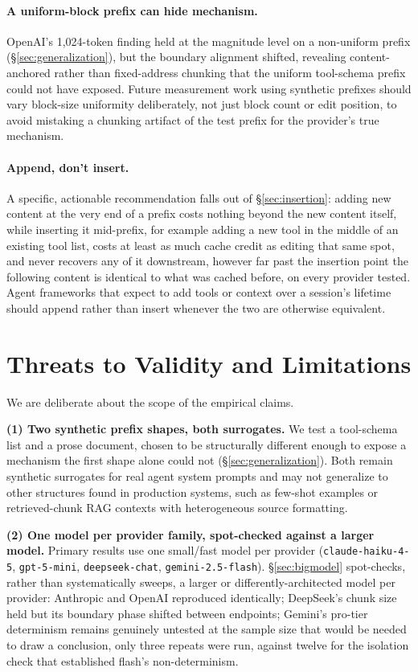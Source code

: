 \documentclass[11pt]{article}
\newcommand{\code}[1]{\texttt{#1}}
\begin{document}
\paragraph{A uniform-block prefix can hide mechanism.} OpenAI's 1{,}024-token
finding held at the magnitude level on a non-uniform prefix
(\S\ref{sec:generalization}), but the boundary alignment shifted, revealing
content-anchored rather than fixed-address chunking that the uniform
tool-schema prefix could not have exposed. Future measurement work using
synthetic prefixes should vary block-size uniformity deliberately, not
just block count or edit position, to avoid mistaking a chunking artifact
of the test prefix for the provider's true mechanism.

\paragraph{Append, don't insert.} A specific, actionable recommendation
falls out of \S\ref{sec:insertion}: adding new content at the very end of
a prefix costs nothing beyond the new content itself, while inserting it
mid-prefix, for example adding a new tool in the middle of an existing
tool list, costs at least as much cache credit as editing that same spot,
and never recovers any of it downstream, however far past the insertion
point the following content is identical to what was cached before, on
every provider tested. Agent frameworks that expect to add tools or
context over a session's lifetime should append rather than insert
whenever the two are otherwise equivalent.

\section{Threats to Validity and Limitations}
\label{sec:limitations}

We are deliberate about the scope of the empirical claims.

\textbf{(1) Two synthetic prefix shapes, both surrogates.} We test a
tool-schema list and a prose document, chosen to be structurally different
enough to expose a mechanism the first shape alone could not
(\S\ref{sec:generalization}). Both remain synthetic surrogates for real
agent system prompts and may not generalize to other structures found in
production systems, such as few-shot examples or retrieved-chunk RAG
contexts with heterogeneous source formatting.

\textbf{(2) One model per provider family, spot-checked against a larger
model.} Primary results use one small/fast model per provider
(\code{claude-haiku-4-5}, \code{gpt-5-mini}, \code{deepseek-chat},
\code{gemini-2.5-flash}). \S\ref{sec:bigmodel} spot-checks, rather than
systematically sweeps, a larger or differently-architected model per
provider: Anthropic and OpenAI reproduced identically; DeepSeek's chunk
size held but its boundary phase shifted between endpoints; Gemini's
pro-tier determinism remains genuinely untested at the sample size that
would be needed to draw a conclusion, only three repeats were run, against
twelve for the isolation check that established flash's non-determinism.
\end{document}
